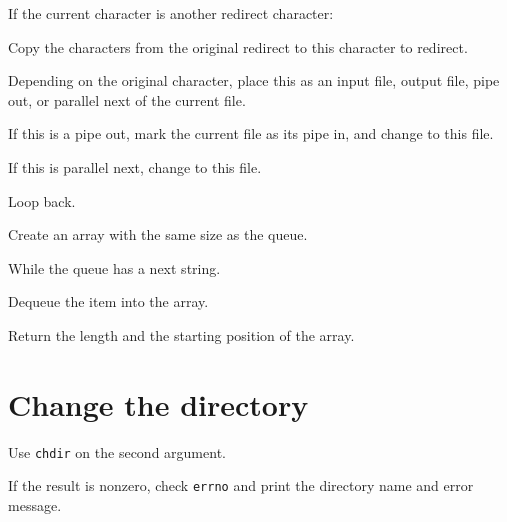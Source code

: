 \documentclass{article}
\begin{document}
\begin{deepenum}
\begin{deepenum}
\begin{deepenum}
\begin{deepenum}
                                    If the current character is another redirect character:
                                        \begin{deepenum}
                                            \item
                                                Copy the characters from the original redirect to this character to redirect.
                                            \item
                                                Depending on the original character, place this as an input file, output file, pipe out, or parallel next of the current file.
                                            \item
                                                If this is a pipe out, mark the current file as its pipe in, and change to this file.
                                            \item
                                                If this is parallel next, change to this file.
                                        \end{deepenum}
                            \end{deepenum}
                \end{deepenum}
        \end{deepenum}
    \item
        Loop back.
    \item
        Create an array with the same size as the queue.
    \item
        While the queue has a next string.
        \begin{deepenum}
            \item
                Dequeue the item into the array.
        \end{deepenum}
    \item
        Return the length and the starting position of the array.
\end{deepenum}

\section{Change the directory}
\begin{deepenum}
    \item
        Use \texttt{chdir} on the second argument.
    \item
        If the result is nonzero, check \texttt{errno} and print the directory name and error message.
\end{deepenum}
\end{document}
